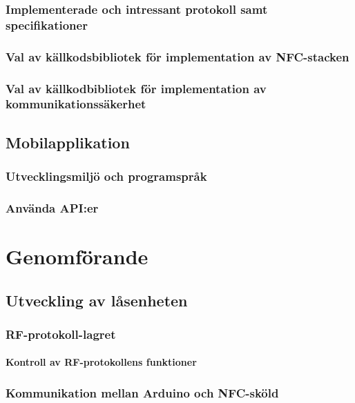 \documentclass[11pt]{article}
\begin{document}
\subsubsection{Implementerade och intressant protokoll samt specifikationer}

\subsubsection{Val av källkodsbibliotek för implementation av NFC-stacken}

\subsubsection{ Val av källkodbibliotek för implementation av kommunikationssäkerhet}

\subsection{Mobilapplikation}

\subsubsection{Utvecklingsmiljö och programspråk}

\subsubsection{Använda API:er}

\section{Genomförande}

\subsection{Utveckling av låsenheten}

\subsubsection{RF-protokoll-lagret}

\paragraph{Kontroll av RF-protokollens funktioner}

\subsubsection{Kommunikation mellan Arduino och NFC-sköld}
\end{document}
